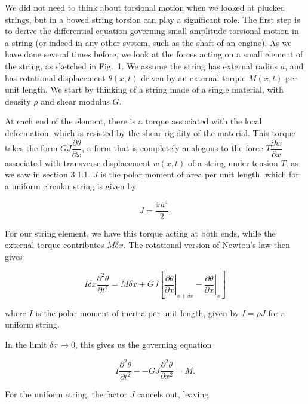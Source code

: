   We did not need to think about torsional motion when we looked at plucked 
  strings, but in a bowed string torsion can play a significant role. The first 
  step is to derive the differential equation governing small-amplitude 
  torsional motion in a string (or indeed in any other system, such as the 
  shaft of an engine). As we have done several times before, we look at the 
  forces acting on a small element of the string, as sketched in Fig.\ 1. We 
  assume the string has external radius $a$, and has rotational displacement 
  $\theta(x,t)$ driven by an external torque $M(x,t)$ per unit length. We start 
  by thinking of a string made of a single material, with density $\rho$ and 
  shear modulus $G$. 


  At each end of the element, there is a torque associated with the local 
  deformation, which is resisted by the shear rigidity of the material. This 
  torque takes the form $GJ \dfrac{\partial \theta}{\partial x}$, a form that 
  is completely analogous to the force $T \dfrac{\partial w}{\partial x}$ 
  associated with transverse displacement $w(x,t)$ of a string under tension 
  $T$, as we saw in section 3.1.1. $J$ is the polar moment of area per unit 
  length, which for a uniform circular string is given by 

  $$J=\dfrac{\pi a^4}{2} . \tag{1}$$ 

  For our string element, we have this torque acting at both ends, while the 
  external torque contributes $M \delta x$. The rotational version of Newton's 
  law then gives 

  $$I \delta x \dfrac{\partial^2 \theta}{\partial t^2} = M \delta x +GJ\left[ 
  \left.\dfrac{\partial \theta}{\partial x} \right|_{x+ \delta x} 
  -\left.\dfrac{\partial \theta}{\partial x} \right|_{x} \right] \tag{2}$$ 

  where $I$ is the polar moment of inertia per unit length, given by $I=\rho J$ 
  for a uniform string. 

  In the limit $\delta x \rightarrow 0$, this gives us the governing equation 

  $$I \dfrac{\partial^2 \theta}{\partial t^2} -- GJ \dfrac{\partial^2 
  \theta}{\partial x^2}= M . \tag{3}$$ 

  For the uniform string, the factor $J$ cancels out, leaving 

